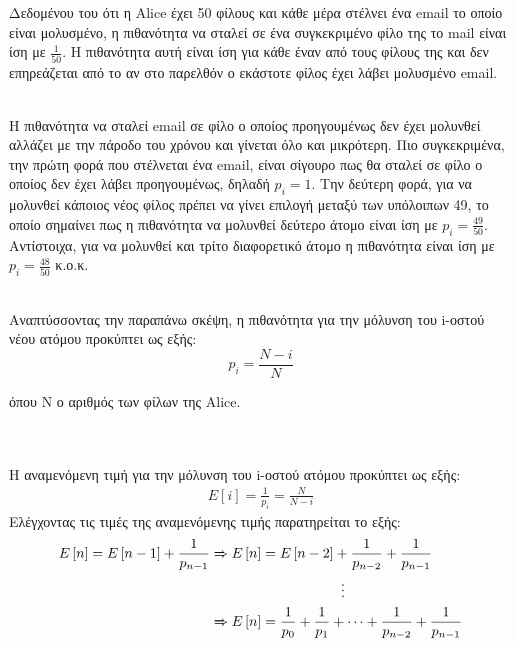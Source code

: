 Δεδομένου του ότι η Alice έχει 50 φίλους και κάθε μέρα στέλνει ένα email το οποίο είναι μολυσμένο, η πιθανότητα να σταλεί σε ένα συγκεκριμένο φίλο της το mail είναι ίση με $\frac{1}{50}$. Η πιθανότητα αυτή είναι ίση για κάθε έναν από τους φίλους της και δεν επηρεάζεται από το αν στο παρελθόν ο εκάστοτε φίλος έχει λάβει μολυσμένο email.

\noindent\\
Η πιθανότητα να σταλεί email σε φίλο ο οποίος προηγουμένως δεν έχει μολυνθεί  αλλάζει με την πάροδο του χρόνου και γίνεται όλο και μικρότερη. Πιο συγκεκριμένα, την πρώτη φορά που στέλνεται ένα email, είναι σίγουρο πως θα σταλεί σε φίλο ο οποίος δεν έχει λάβει προηγουμένως, δηλαδή $p_i = 1$. Την δεύτερη φορά, για να μολυνθεί κάποιος νέος φίλος πρέπει να γίνει επιλογή μεταξύ των υπόλοιπων 49, το οποίο σημαίνει πως η πιθανότητα να μολυνθεί δεύτερο άτομο είναι ίση με $p_i = \frac{49}{50}$. Αντίστοιχα, για να μολυνθεί και τρίτο διαφορετικό άτομο η πιθανότητα είναι ίση με $p_i = \frac{48}{50}$ κ.ο.κ.

\noindent\\
Αναπτύσσοντας την παραπάνω σκέψη, η πιθανότητα για την μόλυνση του i-οστού νέου ατόμου προκύπτει ως εξής:
\begin{equation}
	p_i  = \frac{N - i}{N} \label{p_i_1}
\end{equation}

όπου Ν ο αριθμός των φίλων της Alice.


\noindent\\\\
Η αναμενόμενη τιμή για την μόλυνση του i-οστού ατόμου προκύπτει ως εξής:
\begin{align}
	E\left[i\right] = \frac{1}{p_i} = \frac{N}{N - i} \label{E_i_1}
\end{align}
Ελέγχοντας τις τιμές της αναμενόμενης τιμής παρατηρείται το εξής:
\begin{align}
	E\left[n\right] = E\left[n - 1\right] + \frac{1}{p_{n-1}} &\xRightarrow{}  E\left[n\right] = E\left[n - 2\right] + \frac{1}{p_{n-2}} + \frac{1}{p_{n-1}}  \notag \\
																										& \hspace{3.3cm} \vdots \notag\\
																										& \xRightarrow{} E\left[n\right] = \frac{1}{p_{0}}  + \frac{1}{p_{1}} + \cdots  + \frac{1}{p_{n-2}} + \frac{1}{p_{n-1}} \notag
\end{align}
 
